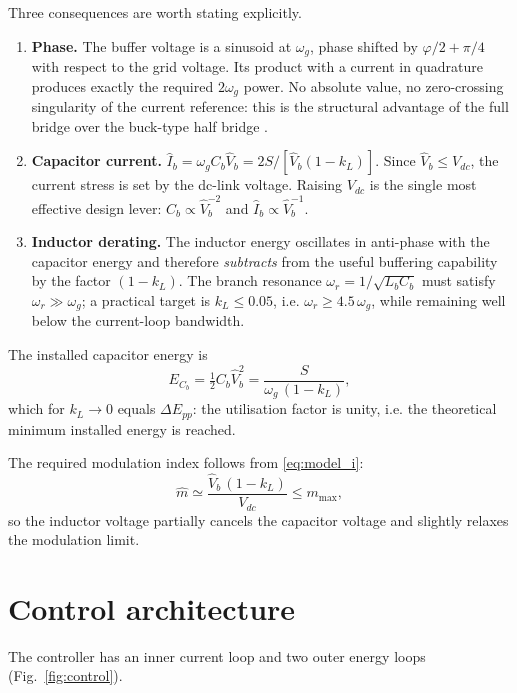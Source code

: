 \documentclass[11pt,a4paper]{article}
\begin{document}
Three consequences are worth stating explicitly.

\begin{enumerate}
\item \textbf{Phase.} The buffer voltage is a sinusoid at $\omega_g$, phase
shifted by $\varphi/2+\pi/4$ with respect to the grid voltage. Its product with
a current in quadrature produces exactly the required $2\omega_g$ power. No
absolute value, no zero-crossing singularity of the current reference: this is
the structural advantage of the full bridge over the buck-type half bridge
\cite{tang2015symmetrical}.

\item \textbf{Capacitor current.} $\hat I_b = \omega_g C_b \hat V_b =
2S/[\hat V_b(1-k_L)]$. Since $\hat V_b \le V_{dc}$, the current stress is set by
the dc-link voltage. Raising $V_{dc}$ is the single most effective design lever:
$C_b\propto\hat V_b^{-2}$ and $\hat I_b\propto\hat V_b^{-1}$.

\item \textbf{Inductor derating.} The inductor energy oscillates in
anti-phase with the capacitor energy and therefore \emph{subtracts} from the
useful buffering capability by the factor $(1-k_L)$. The branch resonance
$\omega_r = 1/\sqrt{L_bC_b}$ must satisfy $\omega_r \gg \omega_g$; a practical
target is $k_L\le 0.05$, i.e. $\omega_r \ge 4.5\,\omega_g$, while remaining well
below the current-loop bandwidth.
\end{enumerate}

The installed capacitor energy is
\begin{equation}
E_{C_b} = \tfrac12 C_b\hat V_b^2 = \frac{S}{\omega_g\,(1-k_L)} ,
\end{equation}
which for $k_L\to 0$ equals $\Delta E_{pp}$: the utilisation factor is unity,
i.e. the theoretical minimum installed energy is reached.

The required modulation index follows from \eqref{eq:model_i}:
\begin{equation}
\hat m \simeq \frac{\hat V_b\,(1-k_L)}{V_{dc}} \le m_{\max},
\end{equation}
so the inductor voltage partially cancels the capacitor voltage and slightly
relaxes the modulation limit.

\section{Control architecture}

The controller has an inner current loop and two outer energy loops
(Fig.~\ref{fig:control}).
\end{document}
